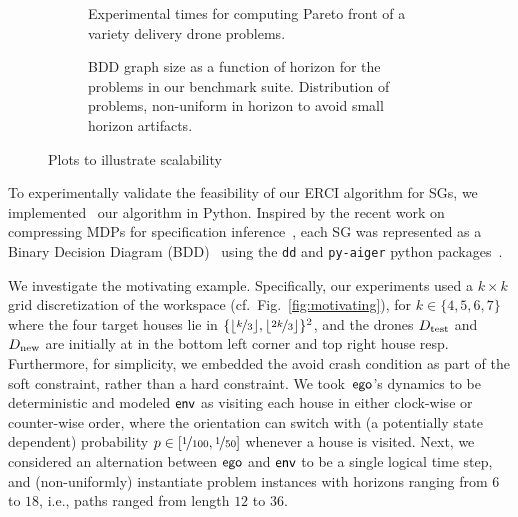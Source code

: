 \begin{figure*}
    \begin{subfigure}{0.47\textwidth}
  \centering
  \scalebox{0.50}{
    
    }
    \caption{
      Experimental times for computing Pareto front of a variety
      delivery drone problems\label{fig:exp_times}.
    }
  \end{subfigure}
  \hfill
    \begin{subfigure}{0.47\textwidth}
    \centering \scalebox{0.53}{
      
    }
    \caption{
      BDD graph size as a function of horizon for the problems in our
      benchmark suite. Distribution of problems, non-uniform in horizon
      to avoid small horizon artifacts\label{fig:bdd_sizes}.
    }
  \end{subfigure}
  \caption{Plots to illustrate scalability} 
\end{figure*}

 To experimentally validate the feasibility of our ERCI
algorithm for SGs, we implemented~\cite{RSS21code} our algorithm in
Python.  Inspired by the recent work on compressing MDPs for
specification inference~\cite{DBLP:conf/cav/Vazquez-Chanlatte20}, each
SG was represented as a Binary Decision Diagram
(BDD)~\cite{DBLP:journals/csur/Bryant92} using the \texttt{dd} and
\texttt{py-aiger} python packages~\cite{dd, pyAiger}.

We investigate the motivating example.
Specifically, our experiments used
a $k\times k$ grid discretization of the workspace (cf.\ Fig.~\ref{fig:motivating}), for $k \in
\{4,5,6,7\}$ where the four target houses lie in
$\{\lfloor\nicefrac{k}{3}\rfloor, \lfloor\nicefrac{2k}{3}\rfloor
\}^2$, and the drones ${D_{\text{test}}}$ and ${D_{\text{new}}}$ are initially at in the bottom left corner and top right house resp. Furthermore, for simplicity, we embedded the avoid crash
condition as part of the soft constraint, rather than a hard
constraint\footnotemark. We took~$\mathsf{ego}$'s dynamics to be deterministic
and modeled $\mathsf{env}$ as visiting each house in either clock-wise or
counter-wise order, where the orientation can switch with
(a potentially state dependent) probability $p \in [\nicefrac{1}{100},
\nicefrac{1}{50}]$ whenever a house is visited. Next, we considered an
alternation between $\mathsf{ego}$ and $\mathsf{env}$ to be a single logical time
step, and (non-uniformly) instantiate problem instances with horizons
ranging from $6$ to $18$, i.e., paths ranged from length $12$ to
$36$.


